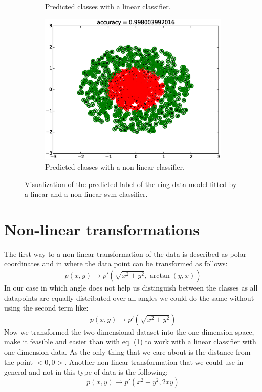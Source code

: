 \documentclass[a4paper,10pt]{article}
\begin{document}
\begin{figure}[ht!]
\begin{subfigure}{.49\textwidth}
    \caption{Predicted classes with a linear classifier.}
    \end{subfigure}
    \begin{subfigure}{.49\textwidth}
    \includegraphics[width=1.00\textwidth]{ringNonLinearFit.eps}
    \caption{Predicted classes with a non-linear classifier.}
    \end{subfigure}
    \caption{Visualization of the predicted label of the ring data model fitted by a linear and a non-linear svm classifier.}
    \label{fig:ringLinear}
\end{figure}


\section{Non-linear transformations}
The first way to a non-linear transformation of the data is described as polar-coordinates and in where the data point can be transformed as follows:
\begin{equation}
p(x,y) \rightarrow p'(\sqrt{x^2 + y^2}, \arctan(y,x))
\end{equation}
In our case in which angle does not help us distinguish between the classes as all datapoints are equally distributed over all angles we could do the same without using the second term like:
\begin{equation}
p(x,y) \rightarrow p'(\sqrt{x^2 + y^2})
\end{equation}
Now we transformed the two dimensional dataset into the one dimension space, make it feasible and easier than with eq. (1) to work with a linear classifier with one dimension data. As the only thing that we care about is the distance from the point $<0,0>$. Another non-linear transformation that we could use in general and not in this type of data is the following:
\begin{equation}
p(x,y) \rightarrow p'(x^2 - y^2, 2xy)
\end{equation}
\end{document}
